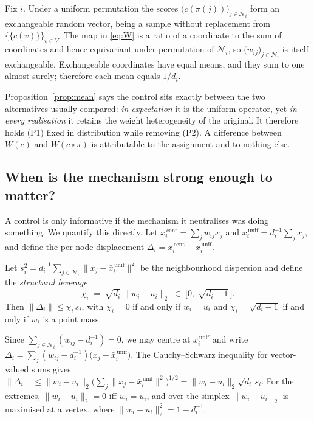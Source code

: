 \begin{IEEEproof}
Fix $i$. Under a uniform permutation the scores
$\bigl(c(\pi(j))\bigr)_{j \in \mathcal{N}_i}$ form an exchangeable random
vector, being a sample without replacement from
$\{\!\{c(v)\}\!\}_{v\in V}$. The map in \eqref{eq:W} is a ratio of a
coordinate to the sum of coordinates and hence equivariant under permutation
of $\mathcal{N}_i$, so $\bigl(w_{ij}\bigr)_{j\in\mathcal{N}_i}$ is itself
exchangeable. Exchangeable coordinates have equal means, and they sum to one
almost surely; therefore each mean equals $1/d_i$.
\end{IEEEproof}

Proposition~\ref{prop:mean} says the control sits exactly between the two
alternatives usually compared: \emph{in expectation} it is the uniform
operator, yet \emph{in every realisation} it retains the weight heterogeneity
of the original. It therefore holds (P1) fixed in distribution while removing
(P2). A difference between $W(c)$ and $W(c\circ\pi)$ is attributable to the
assignment and to nothing else.

\subsection{When is the mechanism strong enough to matter?}
\label{sec:leverage}

A control is only informative if the mechanism it neutralises was doing
something. We quantify this directly. Let
$\bar{x}^{\,\mathrm{cent}}_i = \sum_{j} w_{ij} x_j$ and
$\bar{x}^{\,\mathrm{unif}}_i = d_i^{-1}\sum_{j} x_j$, and define the
per-node displacement $\Delta_i = \bar{x}^{\,\mathrm{cent}}_i -
\bar{x}^{\,\mathrm{unif}}_i$.

\begin{proposition}
\label{prop:leverage}
Let $s_i^2 = d_i^{-1}\sum_{j\in\mathcal{N}_i}\|x_j-\bar{x}^{\,\mathrm{unif}}_i\|^2$
be the neighbourhood dispersion and define the \emph{structural leverage}
%
\begin{equation}
\label{eq:leverage}
\chi_i \;=\; \sqrt{d_i}\,\bigl\|w_i-u_i\bigr\|_2 \;\in\; \bigl[0,\;\sqrt{d_i-1}\,\bigr].
\end{equation}
%
Then $\|\Delta_i\| \le \chi_i\, s_i$, with $\chi_i=0$ if and only if
$w_i=u_i$ and $\chi_i=\sqrt{d_i-1}$ if and only if $w_i$ is a point mass.
\end{proposition}

\begin{IEEEproof}
Since $\sum_{j\in\mathcal{N}_i}(w_{ij}-d_i^{-1})=0$, we may centre at
$\bar{x}^{\,\mathrm{unif}}_i$ and write
$\Delta_i=\sum_{j}(w_{ij}-d_i^{-1})\bigl(x_j-\bar{x}^{\,\mathrm{unif}}_i\bigr)$.
The Cauchy--Schwarz inequality for vector-valued sums gives
$\|\Delta_i\| \le \|w_i-u_i\|_2\bigl(\sum_j \|x_j-\bar{x}^{\,\mathrm{unif}}_i\|^2\bigr)^{1/2}
= \|w_i-u_i\|_2\sqrt{d_i}\,s_i$. For the extremes, $\|w_i-u_i\|_2=0$ iff
$w_i=u_i$, and over the simplex $\|w_i-u_i\|_2$ is maximised at a vertex,
where $\|w_i-u_i\|_2^2 = 1-d_i^{-1}$.
\end{IEEEproof}

